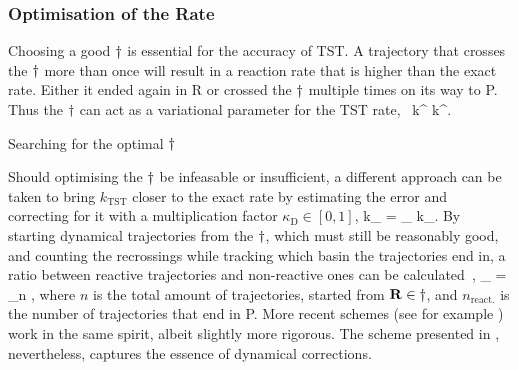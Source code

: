 \subsubsection{Optimisation of the Rate}
Choosing a good $\dagger$ is essential for the accuracy of TST.
A trajectory that crosses the $\dagger$ more than once will result in a reaction rate that is higher than the exact rate.
Either it ended again in R or crossed the $\dagger$ multiple times on its way to P.
Thus the $\dagger$ can act as a variational parameter for the TST rate,~\cite{vtst-1938, vtst-review-1984, vtst-2005}
k^ \ge k^.
\eeq

Searching for the optimal $\dagger$ \expand

Should optimising the $\dagger$ be infeasable or insufficient, a different approach can be taken to bring $k_\text{TST}$ closer to the exact rate by estimating the error and correcting for it with a multiplication factor $\kappa_\text{D} \in [0, 1]$,
k_ = \kappa_ \text{ } k_.
\eeq
By starting dynamical trajectories from the $\dagger$, which must still be reasonably good, and counting the recrossings while tracking which basin the trajectories end in, a ratio between reactive trajectories and non-reactive ones can be calculated~\cite{dynamical-corrections-keck-1962},
\kappa_ = \lim_{n \rightarrow \infty} ,
\eeq
where $n$ is the total amount of trajectories, started from ${\mathrm{\mathbf{\bm{R}}}} \in \dagger$, and $n_\text{react.}$ is the number of trajectories that end in P.
More recent schemes (see for example \cite{vtst-2005, dynamical-corrections-chandler-1977, dynamical-corrections-bennett-1977}) work in the same spirit, albeit slightly more rigorous.
The scheme presented in , nevertheless, captures the essence of dynamical corrections.


